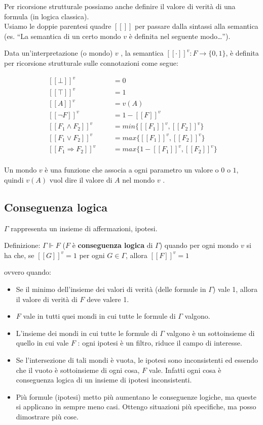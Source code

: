 \documentclass[
  a4paper,
]{article}
\providecommand{\tightlist}{%
  \setlength{\itemsep}{0pt}\setlength{\parskip}{0pt}}
\begin{document}
Per ricorsione strutturale possiamo anche definire il valore di verità
di una formula (in logica classica).\\
Usiamo le doppie parentesi quadre \([[]]\) per passare dalla sintassi
alla semantica (es. ``La semantica di un certo mondo \(v\) è definita
nel seguente modo\ldots{}'').

Data un'interpretazione (o mondo) \(v\) , la semantica
\([[·]]^v : F \to \{0, 1\}\), è definita per ricorsione strutturale
sulle connotazioni come segue:

\[
\begin{aligned}
\;[[\bot]]^v &&& = 0\\[6pt]
\;[[\top]]^v &&& = 1\\[6pt]
\;[[A]]^v &&& = v(A)\\[6pt]
\;[[\neg F]]^v &&& = 1 - [[F]]^v\\[6pt]
\;[[F_1 \land F_2]]^v &&& = min\{[[F_1]]^v, [[F_2]]^v\} \\[6pt]
\;[[F_1 \lor F_2]]^v &&& = max\{[[F_1]]^v, [[F_2]]^v\} \\[6pt]
\;[[F_1 \Rightarrow F_2]]^v &&& = max\{1 - [[F_1]]^v, [[F_2]]^v\} \\[6pt]
\end{aligned}
\]

Un mondo \(v\) è una funzione che associa a ogni parametro un valore o
\(0\) o \(1\), quindi \(v(A)\) vuol dire il valore di \(A\) nel mondo
\(v\) .

\hypertarget{conseguenza-logica}{%
\subsection{Conseguenza logica}\label{conseguenza-logica}}

\(\Gamma\) rappresenta un insieme di affermazioni, ipotesi.

Definizione: \(\Gamma \Vdash F\) (\(F\) è \textbf{conseguenza logica} di
\(\Gamma\)) quando per ogni mondo \(v\) si ha che, se \([[G]]^v = 1\)
per ogni \(G \in \Gamma\), allora \([[F ]]^v = 1\)

ovvero quando:

\begin{itemize}
\tightlist
\item
  Se il minimo dell'insieme dei valori di verità (delle formule in
  \(\Gamma\)) vale 1, allora il valore di verità di \(F\) deve valere 1.
\item
  \(F\) vale in tutti quei mondi in cui tutte le formule di \(\Gamma\)
  valgono.
\item
  L'insieme dei mondi in cui tutte le formule di \(\Gamma\) valgono è un
  sottoinsieme di quello in cui vale \(F\) : ogni ipotesi è un filtro,
  riduce il campo di interesse.
\item
  Se l'intersezione di tali mondi è vuota, le ipotesi sono inconsistenti
  ed essendo che il vuoto è sottoinsieme di ogni cosa, \(F\) vale.
  Infatti ogni cosa è conseguenza logica di un insieme di ipotesi
  inconsistenti.
\item
  Più formule (ipotesi) metto più aumentano le conseguenze logiche, ma
  queste si applicano in sempre meno casi. Ottengo situazioni più
  specifiche, ma posso dimostrare più cose.
\end{itemize}
\end{document}
